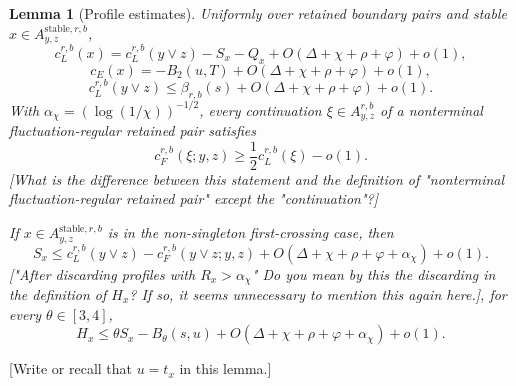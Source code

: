\documentclass[11pt]{article}
\newtheorem{lem}{Lemma}
\newcommand{\stable}{\mathrm{stable}}
\newcommand{\jscomment}[1]{\textup{\textsf{\color{blue}[#1]}}}
\begin{document}
\begin{lem}[Profile estimates]
Uniformly over retained boundary pairs and stable
\(x\in A_{y,z}^{\stable,r,b}\),
\[
    c_L^{r,b}(x)=c_L^{r,b}(y\vee z)-S_x-Q_x
    +O(\Delta+\chi+\rho+\varphi)+o(1),
\]
\[
    c_E(x)=-B_2(u,T)+O(\Delta+\chi+\rho+\varphi)+o(1),
\]
\[
    c_L^{r,b}(y\vee z)\le
    \beta_{r,b}(s)+O(\Delta+\chi+\rho+\varphi)+o(1).
\]
With \(\alpha_\chi=(\log(1/\chi))^{-1/2}\), every continuation
\(\xi\in A_{y,z}^{r,b}\) of a nonterminal fluctuation-regular retained
pair satisfies
\[
    c_F^{r,b}(\xi;y,z)\ge \frac12 c_L^{r,b}(\xi)-o(1).
\]
\jscomment{What is the difference between this statement and the definition of "nonterminal fluctuation-regular retained
pair" except the "continuation"?}

If \(x\in A_{y,z}^{\stable,r,b}\) is in the non-singleton first-crossing
case, then
\[
    S_x\le c_L^{r,b}(y\vee z)-c_F^{r,b}(y\vee z;y,z)
    +O(\Delta+\chi+\rho+\varphi+\alpha_\chi)+o(1).
\]
\jscomment{"After discarding profiles with \(R_x>\alpha_\chi\)" Do you mean by this the discarding in the definition of $H_x$? If so, it seems unnecessary to mention this again here.}, for every
\(\theta\in[3,4]\),
\[
    H_x\le \theta S_x-B_\theta(s,u)
    +O(\Delta+\chi+\rho+\varphi+\alpha_\chi)+o(1).
\]
\end{lem}

\jscomment{Write or recall that $u=t_x$ in this lemma.}
\end{document}
